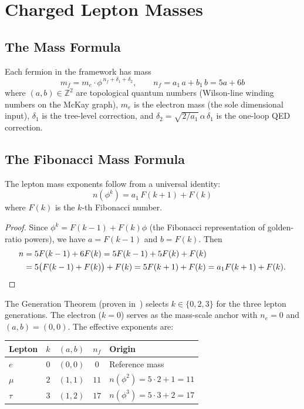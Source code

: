 \documentclass[12pt,a4paper]{article}
\theoremstyle{definition}
\begin{document}
\section{Charged Lepton Masses}
\label{sec:masses}

\subsection{The Mass Formula}

Each fermion in the framework has mass
\begin{equation}
\boxed{m_f = m_e \cdot \phi^{\,n_f + \delta_1 + \delta_2}, \qquad n_f = a_1\,a + b_1\,b = 5a + 6b}
\label{eq:mass_formula}
\end{equation}
where $(a,b) \in \mathbb{Z}^2$ are topological quantum numbers (Wilson-line winding numbers on the McKay graph), $m_e$ is the electron mass (the sole dimensional input), $\delta_1$ is the tree-level correction, and $\delta_2 = \sqrt{2/a_1}\,\alpha\,\delta_1$ is the one-loop QED correction.

\subsection{The Fibonacci Mass Formula}

The lepton mass exponents follow from a universal identity:
\begin{equation}
\boxed{n(\phi^k) = a_1\,F(k+1) + F(k)}
\label{eq:fibonacci}
\end{equation}
where $F(k)$ is the $k$-th Fibonacci number.

\begin{proof}
Since $\phi^k = F(k-1) + F(k)\phi$ (the Fibonacci representation of golden-ratio powers), we have $a = F(k-1)$ and $b = F(k)$.  Then
\begin{align}
n &= 5F(k-1) + 6F(k) = 5F(k-1) + 5F(k) + F(k) \\
  &= 5\bigl(F(k-1) + F(k)\bigr) + F(k) = 5F(k+1) + F(k) = a_1 F(k+1) + F(k). \qedhere
\end{align}
\end{proof}

The Generation Theorem (proven in~\cite{Anghelina2026}) selects $k \in \{0, 2, 3\}$ for the three lepton generations.  The electron ($k = 0$) serves as the mass-scale anchor with $n_e = 0$ and $(a,b) = (0,0)$.  The effective exponents are:
\begin{center}
\begin{tabular}{lcccl}
\toprule
\textbf{Lepton} & $k$ & $(a,b)$ & $n_f$ & \textbf{Origin} \\
\midrule
$e$   & $0$ & $(0,0)$ & $0$  & Reference mass \\
$\mu$ & $2$ & $(1,1)$ & $11$ & $n(\phi^2) = 5 \cdot 2 + 1 = 11$ \\
$\tau$& $3$ & $(1,2)$ & $17$ & $n(\phi^3) = 5 \cdot 3 + 2 = 17$ \\
\bottomrule
\end{tabular}
\end{center}
\end{document}
